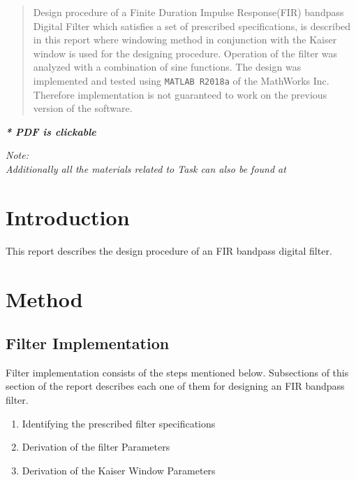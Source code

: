\documentclass[a4paper,11pt]{article}%
\begin{document}


\begin{abstract}
	Design procedure of a Finite Duration Impulse Response(FIR) bandpass Digital Filter which satisfies a set of prescribed specifications, is described in this report where windowing method in conjunction with the Kaiser window is used for the designing procedure. Operation of the filter was analyzed with a combination of sine functions. The design was implemented and tested using {\tt MATLAB R2018a} of the MathWorks Inc. Therefore implementation is not guaranteed to work on the previous version of the software.	
\end{abstract}

\pagebreak
\tableofcontents
\listoffigures
\listoftables
\begin{center}
	\textbf{\textit{* PDF is clickable}}
\end{center}



\textit{Note:}\\
\textit{Additionally all the materials related to Task can also be found at \url{}}
\pagebreak

\section{Introduction}

This report describes the design procedure of an FIR bandpass digital filter.

\section{Method}

\subsection{Filter Implementation}
Filter implementation consists of the steps mentioned below. Subsections of this section of the report describes each one of them for designing an FIR bandpass filter.

\begin{enumerate}[\hspace{1cm}1.]
	\item Identifying the prescribed filter specifications
	\item Derivation of the filter Parameters
	\item Derivation of the Kaiser Window Parameters
\end{enumerate}
\pagebreak
\end{document}
